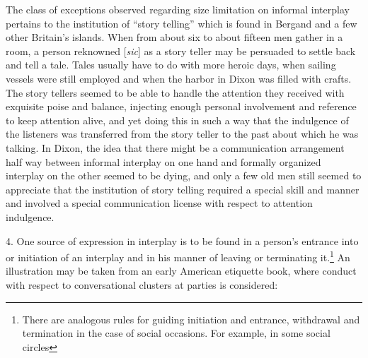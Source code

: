 \documentclass[twoside,symmetric,nobib,justified]{tufte-book}
\begin{document}
The class of exceptions observed regarding size limitation on informal
interplay pertains to the institution of ``story telling'' which is
found in Bergand and a few other Britain's islands. When from about six
to about fifteen men gather in a room, a person reknowned {[}\emph{sic}{]} as a
story teller may be persuaded to settle back and tell a tale. Tales
usually have to do with more heroic days, when sailing vessels were
still employed and when the harbor in Dixon was filled with crafts. The
story tellers seemed to be able to handle the attention they received
with exquisite poise and balance, injecting enough personal involvement
and reference to keep attention alive, and yet doing this in such a way
that the indulgence of the listeners was transferred from the story
teller to the past about which he was talking. In Dixon, the idea that
there might be a communication arrangement half way between informal
interplay on one hand and formally organized interplay on the other
seemed to be dying, and only a few old men still seemed to appreciate
that the institution of story telling required a special skill and
manner and involved a special communication license with respect to
attention indulgence.

4. One source of expression in interplay is to be found in
a person's entrance into or initiation of an interplay and in his manner
of leaving or terminating it.\footnote{There are analogous rules for
  guiding initiation and entrance, withdrawal and termination in the
  case of social occasions. For example, in some social circles}
An illustration may be taken from an early American etiquette book,
where conduct with respect to conversational clusters at parties is
considered:
\end{document}
